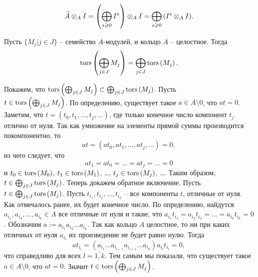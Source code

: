     \begin{equation*}
        \widehat{A} \otimes_A I = \left(\bigoplus_{s \geqslant 0}{I^s}\right) \otimes_A I = 
            \bigoplus_{s \geqslant 0}{\left(I^s \otimes_A I\right)}.
    \end{equation*}

    \begin{Proposal} \label{torsIdentity}
        Пусть $\{M_j | j \in J\}$ -- семейство $A$-модулей, и кольцо $A$ -- целостное. Тогда
        \begin{equation*}
            \textup{tors}\left(\bigoplus_{j \in J} M_j\right) = \bigoplus_{j \in J} \textup{tors}\left(M_j\right).
        \end{equation*}
    \end{Proposal}
    \begin{Proof}
        Покажем, что $\textup{tors}\left(\bigoplus_{j \in J} M_j\right) \subset \bigoplus_{j \in J} \textup{tors}\left(M_j\right)$. 
        Пусть \\ $t \in \textup{tors}\left(\bigoplus_{j \in J} M_j\right)$. По определению, существует такое 
        $a \in A \setminus 0$, что $at = 0$. Заметим, что $t = (t_0, t_1, \dots, t_j, \dots)$, где 
        только конечное число компонент $t_j$ отлично от нуля. Так как умножение на элементы прямой 
        суммы производится покомпонентно, то 
        \begin{equation*}
            at = (at_0, at_1, \dots, at_j, \dots) = 0,
        \end{equation*}
        из чего следует, что 
        \begin{equation*}
            at_1 = at_0 = \dots = at_j = \dots = 0
        \end{equation*}
        и $t_0 \in \textup{tors}\left(M_0\right)$, $t_1 \in \textup{tors}\left(M_1\right)$, \dots, $t_j \in \textup{tors}\left(M_j\right)$, \dots . 
        Таким образом,\\ $t \in \bigoplus_{j \in J} \textup{tors}\left(M_j\right)$. Теперь докажем обратное включение.
        Пусть $t \in \bigoplus_{j \in J} \textup{tors}\left(M_j\right)$. Пусть $t_{i_1}, t_{i_2}, \dots, t_{i_k}$ 
        -- все компоненты $t$, отличные от нуля. Как отмечалось ранее, их будет конечное число. По определению, 
        найдутся  $a_{i_1}, a_{i_2}, \dots, a_{i_k} \in A$ все отличные от нуля и такие, 
        что $a_{i_1}t_{i_1} = a_{i_2}t_{i_2} = \dots = a_{i_k}t_{i_k} = 0$. Обозначим 
        $a := a_{i_1}a_{i_2}\dots a_{i_k}$. Так как кольцо $A$ целостное, то ни при каких отличных от нуля 
        $a_{i_l}$ их произведение не будет равно нулю. Тогда
        \begin{equation*}
            at_{i_l} = (a_{i_1}\dots a_{i_{l-1}}a_{i_{l + 1}}\dots a_{i_k})a_{i_l}t_{i_l} = 0,
        \end{equation*}
        что справедливо для всех $l = \bar{1,k}$. Тем самым мы показали, 
        что существует такое $a \in A \setminus 0$, что $at = 0$. Значит 
        $t \in \textup{tors}\left(\bigoplus_{j \in J} M_j\right)$.
    \end{Proof}

